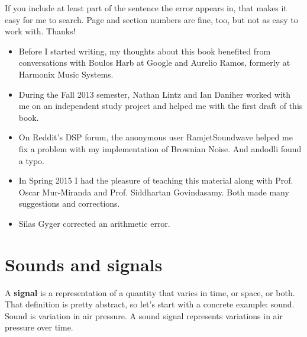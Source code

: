 \documentclass[12pt]{book}
\begin{document}
If you include at least part of the sentence the
error appears in, that makes it easy for me to search.  Page and
section numbers are fine, too, but not as easy to work with.
Thanks!

\small

\begin{itemize}

\item Before I started writing, my thoughts about this book
benefited from conversations with Boulos Harb at Google and
Aurelio Ramos, formerly at Harmonix Music Systems.

\item During the Fall 2013 semester, Nathan Lintz and Ian Daniher
worked with me on an independent study project and helped me with
the first draft of this book.

\item On Reddit's DSP forum, the anonymous user RamjetSoundwave
helped me fix a problem with my implementation of Brownian Noise.
And andodli found a typo.

\item In Spring 2015 I had the pleasure of teaching this material
along with Prof. Oscar Mur-Miranda and Prof. Siddhartan Govindasamy.
Both made many suggestions and corrections.

\item Silas Gyger corrected an arithmetic error.


\end{itemize}

\normalsize

\clearemptydoublepage

\begin{latexonly}

\tableofcontents

\clearemptydoublepage

\end{latexonly}

\mainmatter


\chapter{Sounds and signals}
\label{sounds}

A {\bf signal} is a representation of a quantity that varies in time,
or space, or both.  That definition is pretty abstract, so let's start
with a concrete example: sound.  Sound is variation in air pressure.
A sound signal represents variations in air pressure over time.
\end{document}
